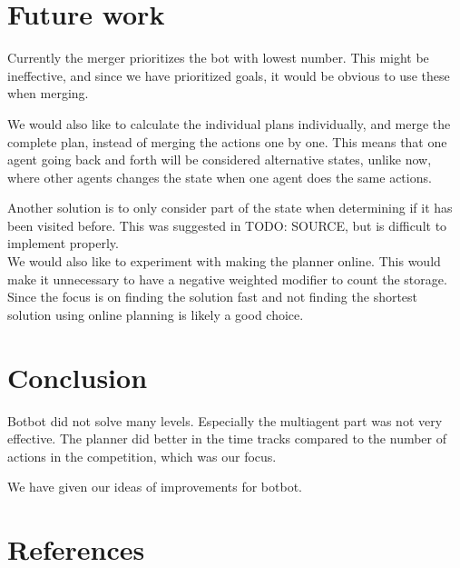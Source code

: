 \documentclass[letterpaper]{article}
\begin{document}
\section{Future work}
Currently the merger prioritizes the bot with lowest number. This might be ineffective,
and since we have prioritized goals, it would be obvious to use these when merging.

We would also like to calculate the individual plans individually, and merge
the complete plan, instead of merging the actions one by one. This means that
one agent going back and forth will be considered alternative states, unlike now,
where other agents changes the state when one agent does the same actions.

Another solution is to only consider part of the state when determining if it has
been visited before. This was suggested in TODO: SOURCE, but is difficult to implement
properly.\\

We would also like to experiment with making the planner online. This would make
it unnecessary to have a negative weighted modifier to count the storage. Since
the focus is on finding the solution fast and not finding the shortest solution
using online planning is likely a good choice.\\
\section{Conclusion}
Botbot did not solve many levels. Especially the multiagent part was not
very effective. The planner did better in the time tracks compared
to the number of actions in the competition, which was our focus.

We have given our ideas of improvements for botbot.

\section{References}


\end{document}
